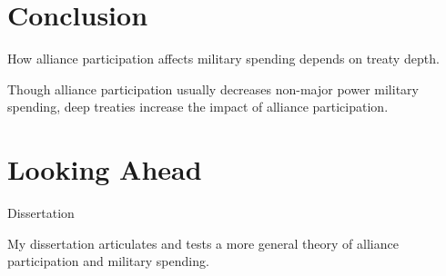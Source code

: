 \documentclass[12pt]{beamer}
\begin{document}

\section{Conclusion}


\begin{frame}[standout]

How alliance participation affects military spending depends on treaty depth.  

\end{frame}

 \begin{frame}[standout]

Though alliance participation usually decreases non-major power military spending, deep treaties increase the impact of alliance participation.

 \end{frame}



\section{Looking Ahead}


\begin{frame}{Dissertation}

My dissertation articulates and tests a more general theory of alliance participation and military spending. 

\end{frame}


\end{document}
